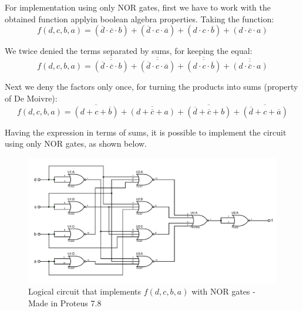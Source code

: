 For implementation using only NOR gates, first we have to work
 with the obtained function applyin boolean algebra properties. 
 Taking the function:
\[
    f(d,c,b,a)=(\overline{d} \cdot \overline{c} \cdot b)+
    (\overline{d} \cdot c \cdot \overline{a})+
    (d \cdot c \cdot \overline{b})+
    (d \cdot \overline{c} \cdot a)
\]
\par
We twice denied the terms separated by sums, for keeping the equal:
\[
    f(d,c,b,a)=\overline{\overline{(\overline{d} \cdot \overline{c} \cdot b)}}+
    \overline{\overline{(\overline{d} \cdot c \cdot \overline{a})}}+
    \overline{\overline{(d \cdot c \cdot \overline{b})}}+
    \overline{\overline{(d \cdot \overline{c} \cdot a)  }}
\]
\par
Next we deny the factors only once, for turning the products 
into sums (property of De Moivre):
\[
    \boxed{f(d,c,b,a)=\overline{(d+c+\overline{b})}+
    \overline{(d+\overline{c}+a)}+
    \overline{(\overline{d}+\overline{c}+b)}+
    \overline{(\overline{d}+c+\overline{a})}}
\]
\par

Having the expression in terms of sums, it is possible to implement 
the circuit using only NOR gates, as shown below.

\begin{figure}[H]
    \begin{centering}
    \includegraphics[width=1\textwidth]{ImplementacionEj2_NOR}
    \par\end{centering}
    \caption{Logical circuit that implements $f(d,c,b,a)$
    with NOR gates - Made in Proteus 7.8}
\end{figure}



